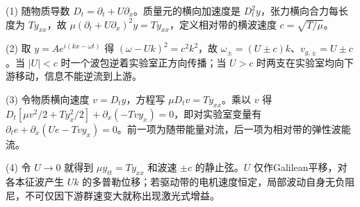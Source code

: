 (1) 随物质导数 \(D_t=\partial_t+U\partial_x\)。质量元的横向加速度是 \(D_t^2y\)，张力横向合力每长度为 \(Ty_{xx}\)，故 \(\boxed{\mu(\partial_t+U\partial_x)^2y=Ty_{xx}}\)，定义相对带的横波速度 \(c=\sqrt{T/\mu}\)。

(2) 取 \(y=Ae^{i(kx-\omega t)}\) 得 \((\omega-Uk)^2=c^2k^2\)，故 \(\boxed{\omega_\pm=(U\pm c)k}\)、\(v_{g,\pm}=U\pm c\)。当 \(|U|<c\) 时一个波包逆着实验室正方向传播；当 \(U>c\) 时两支在实验室均向下游移动，信息不能逆流到上游。

(3) 令物质横向速度 \(v=D_ty\)，方程写 \(\mu D_tv=Ty_{xx}\)。乘以 \(v\) 得 \(D_t[\mu v^2/2+Ty_x^2/2]+\partial_x(-Tvy_x)=0\)，即对实验室变量有 \(\partial_t e+\partial_x(Ue-Tvy_x)=0\)。前一项为随带能量对流，后一项为相对带的弹性波能流。

(4) 令 \(U\to0\) 就得到 \(\mu y_{tt}=Ty_{xx}\) 和波速 \(\pm c\) 的静止弦。\(U\) 仅作Galilean平移，对各本征波产生 \(Uk\) 的多普勒位移；若驱动带的电机速度恒定，局部波动自身无负阻尼，不可仅因下游群速变大就称出现激光式增益。

